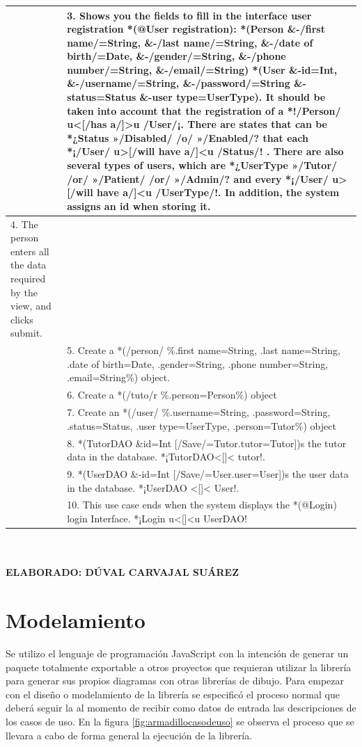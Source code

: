 \begin{table}[]
	\begin{tabular}{| p{7cm} | p{7cm} |}
		\hline
		& 3. Shows you the fields to fill in the interface user registration *(@User registration): *(Person \&-/first name/=String, \&-/last name/=String, \&-/date of birth/=Date, \&-/gender/=String, \&-/phone number/=String, \&-/email/=String) *(User \&-id=Int, \&-/username/=String, \&-/password/=String \&-status=Status \&-user type=UserType). It should be taken into account that the registration of a *!/Person/ u<[/has a/]>u /User/¡. There are states that can be *¿Status »/Disabled/ /o/ »/Enabled/? that each *¡/User/ u>[/will have a/]<u /Status/! . There are also several types of users, which are *¿UserType »/Tutor/ /or/ »/Patient/ /or/ »/Admin/? and every *¡/User/ u>[/will have a/]<u /UserType/!. In addition, the system assigns an id when storing it. \\ \hline
		4. The person enters all the data required by the view, and clicks submit. & \\ \hline
		& 5. Create a *(/person/ \%.first name=String, .last name=String, .date of birth=Date, .gender=String, .phone number=String, .email=String\%) object. \\ \hline
		& 6. Create a *(/tuto/r \%.person=Person\%) object \\ \hline
		& 7. Create an *(/user/ \%.username=String, .password=String, .status=Status, .user type=UserType, .person=Tutor\%) object \\ \hline
		& 8. *(TutorDAO \&id=Int [/Save/=Tutor{.tutor=Tutor}])s the tutor data in the database. *¡TutorDAO<[]< tutor!. \\ \hline
		& 9. *(UserDAO \&-id=Int [/Save/=User{.user=User}])s the user data in the database. *¡UserDAO <[]< User!. \\ \hline
		& 10. This use case ends when the system displays the *(@Login) login Interface. *¡Login u<[]<u UserDAO! \\ \hline
	\end{tabular} \\
\textbf{\\ ELABORADO: DÚVAL CARVAJAL SUÁREZ}
\end{table}

\section{Modelamiento}

Se utilizo el lenguaje de programación JavaScript con la intención de generar un paquete totalmente exportable a otros proyectos que requieran utilizar la librería para generar sus propios diagramas con otras librerías de dibujo. Para empezar con el diseño o modelamiento de la librería se especificó el proceso normal que deberá seguir la al momento de recibir como datos de entrada las descripciones de los casos de uso. En la figura \ref{fig:armadillocasodeuso} se observa el proceso que se llevara a cabo de forma general la ejecución de la librería.

